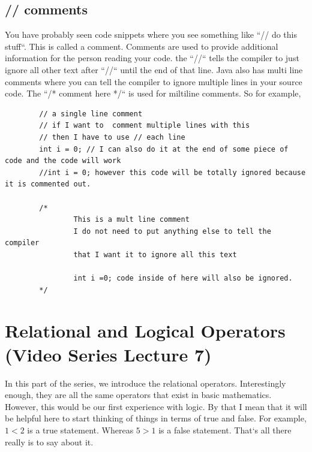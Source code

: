 \documentclass[11]{article}
\begin{document}
\subsection{// comments}
You have probably seen code snippets where you see something like ``// do this stuff``. This is called a comment. Comments are used to provide additional information for the person reading your code. the ``//`` tells the compiler to just ignore all other text after ``//`` until the end of that line. Java also has multi line comments where you can tell the compiler to ignore multiple lines in your source code. The ``/* comment here */`` is used for miltiline comments. So for example, 

\begin{lstlisting}
        // a single line comment
        // if I want to  comment multiple lines with this
        // then I have to use // each line
        int i = 0; // I can also do it at the end of some piece of code and the code will work
        //int i = 0; however this code will be totally ignored because it is commented out.
        
        /*
				This is a mult line comment
				I do not need to put anything else to tell the compiler
				that I want it to ignore all this text
				
				int i =0; code inside of here will also be ignored.        
        */
\end{lstlisting}

\section{Relational and Logical Operators (Video Series Lecture 7)}
In this part of the series, we introduce the relational operators.  Interestingly enough, they are all the same operators that exist in basic mathematics. However, this would be our first experience with logic. By that I mean that it will be helpful here to start thinking of things in terms of true and false. For example, $1<2$ is a true statement. Whereas $5>1$ is a false statement. That`s all there really is to say about it.
\end{document}
